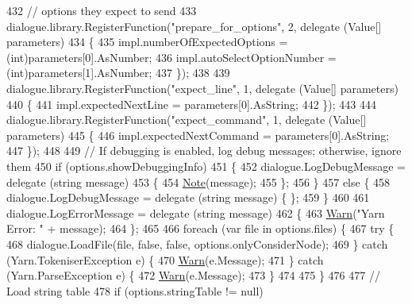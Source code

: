 \begin{DoxyCode}
432             \textcolor{comment}{// options they expect to send}
433             dialogue.library.RegisterFunction(\textcolor{stringliteral}{"prepare\_for\_options"}, 2, delegate (Value[] parameters)
434             \{
435                 impl.numberOfExpectedOptions = (int)parameters[0].AsNumber;
436                 impl.autoSelectOptionNumber = (int)parameters[1].AsNumber;
437             \});
438 
439             dialogue.library.RegisterFunction(\textcolor{stringliteral}{"expect\_line"}, 1, delegate (Value[] parameters)
440             \{
441                 impl.expectedNextLine = parameters[0].AsString;
442             \});
443 
444             dialogue.library.RegisterFunction(\textcolor{stringliteral}{"expect\_command"}, 1, delegate (Value[] parameters)
445             \{
446                 impl.expectedNextCommand = parameters[0].AsString;
447             \});
448 
449             \textcolor{comment}{// If debugging is enabled, log debug messages; otherwise, ignore them}
450             \textcolor{keywordflow}{if} (options.showDebuggingInfo)
451             \{
452                 dialogue.LogDebugMessage = delegate (\textcolor{keywordtype}{string} message)
453                 \{
454                     \hyperlink{a00185_a939cc9e943c574b36c6af93e9c772702}{Note}(message);
455                 \};
456             \}
457             \textcolor{keywordflow}{else} \{
458                 dialogue.LogDebugMessage = delegate (\textcolor{keywordtype}{string} message) \{ \};
459             \}
460 
461             dialogue.LogErrorMessage = delegate (\textcolor{keywordtype}{string} message)
462             \{
463                 \hyperlink{a00185_a979bb6f049b6c5294f745a19e24ddd9d}{Warn}(\textcolor{stringliteral}{"Yarn Error: "} + message);
464             \};
465 
466             \textcolor{keywordflow}{foreach} (var file \textcolor{keywordflow}{in} options.files) \{
467                 \textcolor{keywordflow}{try} \{
468                     dialogue.LoadFile(file, \textcolor{keyword}{false}, \textcolor{keyword}{false}, options.onlyConsiderNode);
469                 \} \textcolor{keywordflow}{catch} (Yarn.TokeniserException e) \{
470                     \hyperlink{a00185_a979bb6f049b6c5294f745a19e24ddd9d}{Warn}(e.Message);
471                 \} \textcolor{keywordflow}{catch} (Yarn.ParseException e) \{
472                     \hyperlink{a00185_a979bb6f049b6c5294f745a19e24ddd9d}{Warn}(e.Message);
473                 \}
474 
475             \}
476 
477             \textcolor{comment}{// Load string table}
478             \textcolor{keywordflow}{if} (options.stringTable != null)

\end{DoxyCode}
